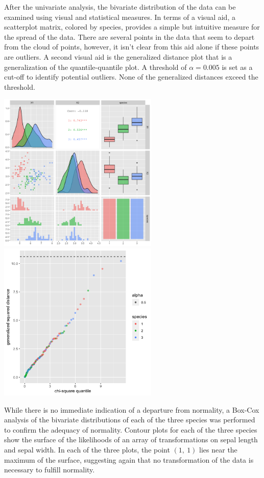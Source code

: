After the univariate analysis, the bivariate distribution of the data can be examined using visual and statistical measures. In terms of a visual aid, a scatterplot matrix, colored by species, provides a simple but intuitive measure for the spread of the data. There are several points in the data that seem to depart from the cloud of points, however, it isn't clear from this aid alone if these points are outliers. A second visual aid is the generalized distance plot that is a generalization of the quantile-quantile plot. A threshold of $\alpha=0.005$ is set as a cut-off to identify potential outliers. None of the generalized distances exceed the threshold.

\begin{center}
	\includegraphics[width=3.0in]{I_1_matrix.png}
	\includegraphics[width=3.0in]{I_1_chisq.png}
\end{center}

While there is no immediate indication of a departure from normality, a Box-Cox analysis of the bivariate distributions of each of the three species was performed to confirm the adequacy of normality. Contour plots for each of the three species show the surface of the likelihoods of an array of transformations on sepal length and sepal width. In each of the three plots, the point $(1,\ 1)$ lies near the maximum of the surface, suggesting again that no transformation of the data is necessary to fulfill normality.

